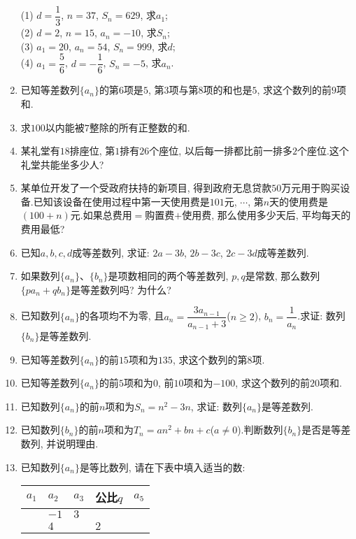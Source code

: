 \documentclass[10pt,a4paper]{article}
\begin{document}
\begin{enumerate}[1.]
(1) $d=\dfrac 13$, $n=37$, $S_n=629$, 求$a_1$;\\
(2) $d=2$, $n=15$, $a_n=-10$, 求$S_n$;\\
(3) $a_1=20$, $a_n=54$, $S_n=999$, 求$d$;\\
(4) $a_1=\dfrac 56$, $d=-\dfrac 16$, $S_n=-5$, 求$a_n$.
\item 已知等差数列$\{a_n\}$的第$6$项是$5$, 第$3$项与第$8$项的和也是$5$, 求这个数列的前$9$项和.
\item 求$100$以内能被$7$整除的所有正整数的和.
\item 某礼堂有$18$排座位, 第$1$排有$26$个座位, 以后每一排都比前一排多$2$个座位.这个礼堂共能坐多少人?
\item 某单位开发了一个受政府扶持的新项目, 得到政府无息贷款$50$万元用于购买设备.已知该设备在使用过程中第一天使用费是$101$元, $\cdots$, 第$n$天的使用费是$(100+n)$元.如果总费用$=$购置费$+$使用费, 那么使用多少天后, 平均每天的费用最低?
\item 已知$a,b,c,d$成等差数列, 求证: $2a-3b$, $2b-3c$, $2c-3d$成等差数列.
\item 如果数列$\{a_n\}$、$\{b_n\}$是项数相同的两个等差数列, $p,q$是常数, 那么数列$\{pa_n+qb_n\}$是等差数列吗? 为什么?
\item 已知数列$\{a_n\}$的各项均不为零, 且$a_n=\dfrac{3a_{n-1}}{a_{n-1}+3}$($n\ge 2$), $b_n=\dfrac 1{a_n}$.求证: 数列$\{b_n\}$是等差数列.
\item 已知等差数列$\{a_n\}$的前$15$项和为$135$, 求这个数列的第$8$项.
\item 已知等差数列$\{a_n\}$的前$5$项和为$0$, 前$10$项和为$-100$, 求这个数列的前$20$项和.
\item 已知数列$\{a_n\}$的前$n$项和为$S_n=n^2-3n$, 求证: 数列$\{a_n\}$是等差数列.
\item 已知数列$\{b_n\}$的前$n$项和为$T_n=an^2+bn+c$($a\ne 0$).判断数列$\{b_n\}$是否是等差数列, 并说明理由.
\item 已知数列$\{a_n\}$是等比数列, 请在下表中填入适当的数:
\begin{center}
    \begin{tabular}{|p{}<{\centering}|p{}<{\centering}|p{}<{\centering}|p{}<{\centering}|p{}<{\centering}|}
        \hline
        $a_1$ & $a_2$ & $a_3$ & 公比$q$ & $a_5$ \\ \hline
         & $-1$ & $3$ & & \\ \hline
        & $4$ & & $2$ & \\ \hline
    \end{tabular}
\end{center}

\end{enumerate}
\end{document}
